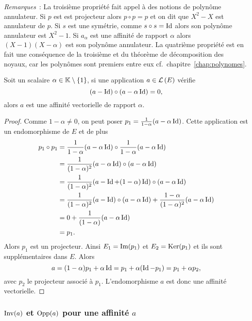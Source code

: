 \emph{Remarques}~: La troisième propriété fait appel à des notions de polynôme 
annulateur. Si \(p\) est est projecteur alors \(p \circ p=p\) et on dit que 
\(X^2-X\) est annulateur de \(p\). Si \(s\) est une symétrie, comme \(s \circ s 
=\operatorname{Id}\) alors son polynôme annulateur est \(X^2-1\). Si \(a_\alpha\) est une 
affinité de rapport \(\alpha\) alors \((X-1)(X-\alpha)\) est son polynôme 
annulateur. La quatrième propriété est en fait une conséquence de la troisième 
et du théorème de décomposition des noyaux, car les polynômes sont premiers 
entre eux cf.\ chapitre~\ref{chap:polynomes}.

\begin{prop}
  Soit un scalaire \(\alpha \in \mathbb{K}\setminus\{1\}\), si une application \(a \in 
  \mathcal{L}\left(E\right)\) vérifie
  \begin{equation}
    (a-\operatorname{Id})\circ (a-\alpha \operatorname{Id})=0,
  \end{equation}
  alors \(a\) est une affinité vectorielle de rapport \(\alpha\).
\end{prop}
\begin{proof}
  Comme \(1-\alpha\neq 0\), on peut poser \(p_1=\frac{1}{1-\alpha} 
  (a-\alpha\operatorname{Id})\). Cette application est un endomorphisme de \(E\) et de plus
  \begin{align}
    p_1 \circ p_1 &= \frac{1}{1-\alpha} (a-\alpha\operatorname{Id}) \circ \frac{1}{1-\alpha} 
    (a-\alpha\operatorname{Id}) \\
    &=\frac{1}{(1-\alpha)^2} (a-\alpha\operatorname{Id}) \circ (a-\alpha\operatorname{Id}) \\
    &=\frac{1}{(1-\alpha)^2} (a-\operatorname{Id} +(1-\alpha)\operatorname{Id}) \circ (a-\alpha\operatorname{Id}) \\
    &=\frac{1}{(1-\alpha)^2} (a-\operatorname{Id}) \circ (a-\alpha\operatorname{Id}) + 
    \frac{1-\alpha}{(1-\alpha)^2}(a-\alpha\operatorname{Id}) \\
    &= 0 + \frac{1}{(1-\alpha)}(a-\alpha\operatorname{Id})\\
    &=p_1.
  \end{align}
  Alors \(p_1\) est un projecteur. Ainsi \(E_1=\operatorname{Im}(p_1)\) et 
  \(E_2=\operatorname{Ker}(p_1)\) et ils sont supplémentaires dans \(E\). Alors
  \begin{equation}
    a=(1-\alpha)p_1 +\alpha \operatorname{Id} = p_1 +\alpha(\operatorname{Id}-p_1) = p_1+\alpha p_2,
  \end{equation}
  avec \(p_2\) le projecteur associé à \(p_1\). L'endomorphisme \(a\) est donc 
  une affinité vectorielle.
\end{proof}

\subsubsection{\(\operatorname{Inv}(a)\) et \(\operatorname{Opp}(a)\) pour une affinité \(a\)}

